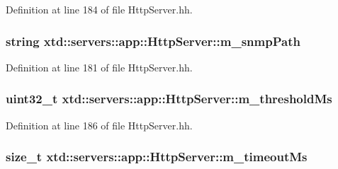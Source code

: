 Definition at line 184 of file Http\+Server.\+hh.

\subsubsection[{\texorpdfstring{m\+\_\+snmp\+Path}{m_snmpPath}}]{\setlength{\rightskip}{0pt plus 5cm}string xtd\+::servers\+::app\+::\+Http\+Server\+::m\+\_\+snmp\+Path\hspace{0.3cm}{\ttfamily [protected]}}\hypertarget{classxtd_1_1servers_1_1app_1_1HttpServer_a555ce1e115602fda522a5c0a675dace3}{}\label{classxtd_1_1servers_1_1app_1_1HttpServer_a555ce1e115602fda522a5c0a675dace3}


Definition at line 181 of file Http\+Server.\+hh.

\subsubsection[{\texorpdfstring{m\+\_\+threshold\+Ms}{m_thresholdMs}}]{\setlength{\rightskip}{0pt plus 5cm}uint32\+\_\+t xtd\+::servers\+::app\+::\+Http\+Server\+::m\+\_\+threshold\+Ms\hspace{0.3cm}{\ttfamily [protected]}}\hypertarget{classxtd_1_1servers_1_1app_1_1HttpServer_ad7f8a9a0475e17154850c3d575bf6f05}{}\label{classxtd_1_1servers_1_1app_1_1HttpServer_ad7f8a9a0475e17154850c3d575bf6f05}


Definition at line 186 of file Http\+Server.\+hh.

\subsubsection[{\texorpdfstring{m\+\_\+timeout\+Ms}{m_timeoutMs}}]{\setlength{\rightskip}{0pt plus 5cm}size\+\_\+t xtd\+::servers\+::app\+::\+Http\+Server\+::m\+\_\+timeout\+Ms\hspace{0.3cm}{\ttfamily [protected]}}\hypertarget{classxtd_1_1servers_1_1app_1_1HttpServer_adcaefcc003e9503dbe6ebea90bf70ef7}{}\label{classxtd_1_1servers_1_1app_1_1HttpServer_adcaefcc003e9503dbe6ebea90bf70ef7}


